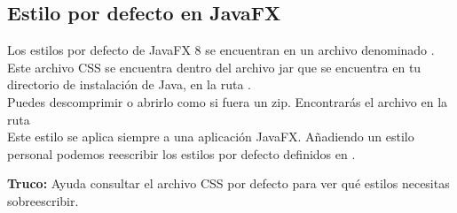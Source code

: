 \subsection{Estilo por defecto en JavaFX}
Los estilos por defecto de JavaFX 8 se encuentran en un archivo denominado . 
Este archivo CSS se encuentra dentro del archivo jar  que se encuentra en tu 
directorio de instalación de Java, en la ruta .\\
Puedes descomprimir  o abrirlo como si fuera un zip. Encontrarás el archivo 
 en la ruta \\
Este estilo se aplica siempre a una aplicación JavaFX. Añadiendo un estilo personal 
podemos reescribir los estilos por defecto definidos en .

\begin{tcolorbox}[leftrule=3mm]
	\textbf{Truco:} Ayuda consultar el archivo CSS por defecto para ver qué estilos necesitas sobreescribir.
\end{tcolorbox}
